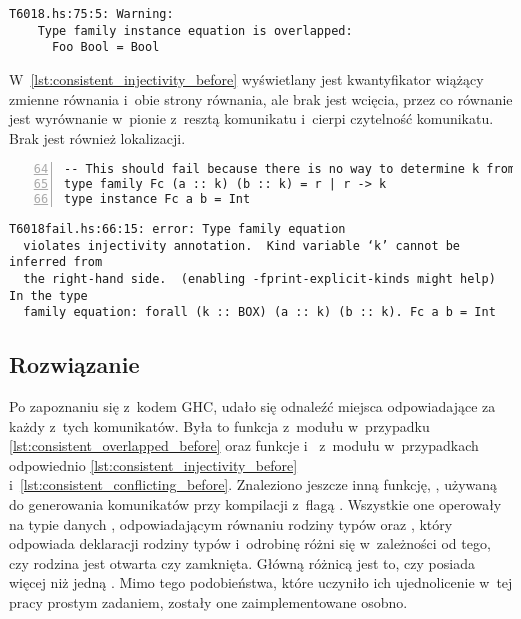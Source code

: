\begin{lstlisting}[float,language={},label={lst:consistent_overlapped_before},
                   caption={Ostrzeżenie generowane przez kompilator w przypadku \ref{lst:consistent_overlapped_code} przed wprowadzeniem zmian.}]
T6018.hs:75:5: Warning:
    Type family instance equation is overlapped:
      Foo Bool = Bool
\end{lstlisting}

W~\ref{lst:consistent_injectivity_before} wyświetlany jest kwantyfikator wiążący
zmienne równania i~obie strony równania, ale brak jest wcięcia, przez co
równanie jest wyrównanie w~pionie z~resztą komunikatu i~cierpi czytelność
komunikatu. Brak jest również lokalizacji.

\begin{lstlisting}[float,numbers=left,firstnumber=64,label={lst:consistent_injectivity_code},
                   caption={Fragment testu T6018fail z równaniem rodziny typów nie spełniającej warunku różnowartościowości.}]
-- This should fail because there is no way to determine k from the RHS
type family Fc (a :: k) (b :: k) = r | r -> k
type instance Fc a b = Int
\end{lstlisting}

\begin{lstlisting}[float,language={},label={lst:consistent_injectivity_before},
                   caption={Błąd generowany przez kompilator w przypadku \ref{lst:consistent_injectivity_code} przed wprowadzeniem zmian.}]
T6018fail.hs:66:15: error: Type family equation
  violates injectivity annotation.  Kind variable ‘k’ cannot be inferred from
  the right-hand side.  (enabling -fprint-explicit-kinds might help) In the type
  family equation: forall (k :: BOX) (a :: k) (b :: k). Fc a b = Int
\end{lstlisting}


\subsection{Rozwiązanie} %

Po zapoznaniu się z~kodem GHC, udało się odnaleźć miejsca odpowiadające za każdy
z~tych komunikatów. Była to funkcja  z~modułu 
w~przypadku \ref{lst:consistent_overlapped_before} oraz funkcje 
i~ z~modułu  w~przypadkach odpowiednio
\ref{lst:consistent_injectivity_before} i~\ref{lst:consistent_conflicting_before}.
Znaleziono jeszcze inną funkcję,
, używaną do generowania komunikatów przy kompilacji z~flagą
. Wszystkie one operowały na typie danych ,
odpowiadającym równaniu rodziny typów oraz , który odpowiada
deklaracji rodziny typów i~odrobinę różni się w~zależności od tego, czy rodzina
jest otwarta czy zamknięta. Główną różnicą jest to, czy posiada więcej niż jedną
. Mimo tego podobieństwa, które uczyniło ich ujednolicenie
w~tej pracy prostym zadaniem, zostały one zaimplementowane osobno.

